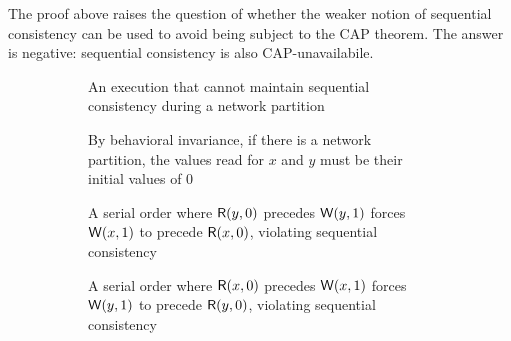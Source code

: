 \documentclass[]             %
{NASA}                       %
\theoremstyle{definition}
\begin{document}
The proof above raises the question of whether the weaker notion of
sequential consistency can be used to avoid being subject to the CAP
theorem. The answer is negative: sequential consistency is also
CAP-unavailabile.

\begin{figure}[p]
  \setlength\belowcaptionskip{5ex}
  \begin{subfigure}{1\textwidth}
    \centering
  
  \caption{An execution that cannot maintain sequential consistency during a network partition}
  \label{fig:dsm-cap-example-2}
  \end{subfigure}
  \begin{subfigure}{1\textwidth}
    \centering
    
    \caption{By behavioral invariance, if there is a network partition, the values read for $x$ and $y$ must be their initial values of $0$}
    \label{fig:dsm-cap-example-2-results}
  \end{subfigure}
  \begin{subfigure}{1\textwidth}
    \centering
    
    \caption{A serial order where $\mathsf{R}\!\left(y, 0\right)$ precedes $\mathsf{W}\!\left(y, 1\right)$ forces $\mathsf{W}\!\left(x, 1\right)$ to precede $\mathsf{R}\!\left(x, 0\right)$, violating sequential consistency}
    \label{fig:dsm-cap-example-2-serial1}
  \end{subfigure}
  \begin{subfigure}{1\textwidth}
    \centering
    
    \caption{A serial order where $\mathsf{R}\!\left(x, 0\right)$ precedes $\mathsf{W}\!\left(x, 1\right)$ forces $\mathsf{W}\!\left(y, 1\right)$ to precede $\mathsf{R}\!\left(y, 0\right)$, violating sequential consistency}
    \label{fig:dsm-cap-example-2-serial2}
  \end{subfigure}
  \caption{}
  \label{}
\end{figure}
\end{document}
